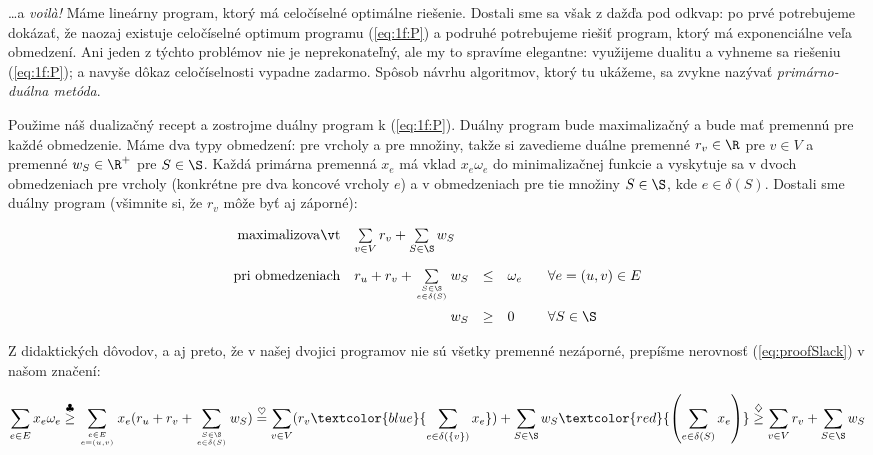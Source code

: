 \noindent
\ldots a {\em voilà!} Máme lineárny program, ktorý má celočíselné optimálne riešenie.
Dostali sme sa však z dažďa pod odkvap: po prvé potrebujeme dokázať, že naozaj existuje
celočíselné optimum programu (\ref{eq:1f:P}) a podruhé potrebujeme riešiť program, ktorý má 
exponenciálne veľa obmedzení. Ani jeden z týchto problémov nie je neprekonateľný, ale my
to spravíme elegantne: využijeme dualitu a vyhneme sa riešeniu (\ref{eq:1f:P}); a navyše 
dôkaz celočíselnosti vypadne zadarmo.
Spôsob návrhu algoritmov, ktorý tu ukážeme, sa zvykne nazývať {\em primárno-duálna metóda}.

\noindent
Použime náš dualizačný recept a zostrojme duálny program k (\ref{eq:1f:P}).
Duálny program bude maximalizačný a bude mať premennú pre každé obmedzenie. Máme dva typy
obmedzení: pre vrcholy a pre množiny, takže si zavedieme duálne premenné $r_v\in\R$ pre $v\in V$
a premenné $w_S\in\R^+$ pre $S\in\S$.
Každá primárna premenná  $x_e$ má vklad $x_e\omega_e$ do minimalizačnej funkcie a vyskytuje
sa v dvoch obmedzeniach pre vrcholy (konkrétne pre dva koncové vrcholy $e$) a v obmedzeniach
pre tie množiny $S\in\S$, kde $e\in\delta(S)$.
Dostali sme duálny program (všimnite si, že $r_v$ môže byť aj záporné):

\begin{equation}
  \label{eq:1f:D}
\begin{array}{rrcll}
  {\rm maximalizovať}     & \multicolumn{1}{l}{\sum\limits_{v\in V}r_v + \sum\limits_{S\in\S}w_S}\\[4ex]
  {\rm pri\ obmedzeniach} & 
        r_u + r_v + \sum\limits_{S\in\S\atop e\in\delta(S)} w_S &\le&\omega_e& \;\;\;\forall e=(u,v)\in E\\[4ex]
                          & w_S&\ge&0& \;\;\;\forall S\in\S\\
\end{array}
\end{equation}

\noindent
Z didaktických dôvodov, a aj preto, že v našej dvojici programov nie sú všetky premenné nezáporné,
prepíšme nerovnosť (\ref{eq:proofSlack}) v našom značení:


$$
\sum_{e\in E}x_e\omega_e
\stackrel{\clubsuit}{\ge}
\sum_{e\in E\atop e=(u,v)}x_e(r_u+r_v+\sum_{S\in\S\atop e\in\delta(S)}w_S)
\stackrel{\heartsuit}{=}
\sum_{v\in V}(r_v  \textcolor{blue}{\sum_{e\in\delta(\{v\})}x_e} )   + \sum_{S\in\S}w_S
\textcolor{red}{\left(\sum_{e\in\delta(S)}x_e\right)}
\stackrel{\diamondsuit}{\ge}
\sum_{v\in V}r_v+\sum_{S\in\S}w_S
$$


